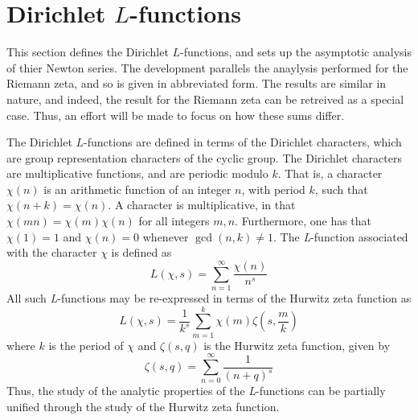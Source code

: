\documentclass{amsart}
\begin{document}
\section{Dirichlet $L$-functions}

This section defines the Dirichlet $L$-functions, and sets up 
the asymptotic analysis of thier Newton series. The development
parallels the anaylysis performed for the Riemann zeta, and so
is given in abbreviated form. The results are similar in nature,
and indeed, the result for the Riemann zeta can be retreived as 
a special case.  Thus, an effort will be made to focus on how these
sums differ.

The Dirichlet $L$-functions\cite{Apostol76,Davenport80} are defined
in terms of the Dirichlet characters, which are group representation
characters of the cyclic group. 
The Dirichlet characters are multiplicative functions, and are periodic
modulo $k$. That is, a character $\chi(n)$ is an arithmetic function
of an integer $n$, with period $k$, such that $\chi(n+k)=\chi(n)$.
A character is multiplicative, in that $\chi(mn)=\chi(m)\chi(n)$
for all integers $m,n$. Furthermore, one has that $\chi(1)=1$ and
$\chi(n)=0$ whenever $\gcd(n,k)\ne1$. The \emph{L}-function associated
with the character $\chi$ is defined as \begin{equation}
L(\chi,s)=\sum_{n=1}^{\infty}\frac{\chi(n)}{n^{s}}\label{eq:}\end{equation}
 All such \emph{L}-functions may be re-expressed in terms of the Hurwitz
zeta function as
\begin{equation}
L(\chi,s)=\frac{1}{k^{s}}\sum_{m=1}^{k}\chi(m)\zeta\left(s,\frac{m}{k}\right)\label{eq:L-Hurwitz}\end{equation}
 where $k$ is the period of $\chi$ and $\zeta(s,q)$ is the Hurwitz
zeta function, given by \begin{equation}
\zeta(s,q)=\sum_{n=0}^{\infty}\frac{1}{(n+q)^{s}}\label{eq:}\end{equation}
 Thus, the study of the analytic properties of the \emph{L}-functions
can be partially unified through the study of the Hurwitz zeta function.


\end{document}
